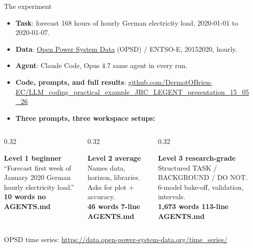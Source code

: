 \documentclass[aspectratio=169,11pt]{beamer}
\newcommand{\levelcard}[3]{%
  \begin{tcolorbox}[
    colback=cardbg, colframe=#1, boxrule=1.2pt, arc=3pt,
    left=6pt, right=6pt, top=4pt, bottom=4pt,
    valign=top, height=3.4cm, fontupper=\small,
  ]
    \textbf{\textcolor{#1}{#2}}\\[2pt]
    \scriptsize\textcolor{gray!40!black}{#3}
  \end{tcolorbox}%
}
\begin{document}
\begin{frame}{The experiment}
  \begin{itemize}\small
    \item \textbf{Task}: forecast 168 hours of hourly German electricity load,
          2020-01-01 to 2020-01-07.
    \item \textbf{Data}: \href{https://data.open-power-system-data.org/time_series/}{Open Power System Data} (OPSD) / ENTSO-E, 2015\textendash{}2020, hourly.
    \item \textbf{Agent}: Claude Code, Opus 4.7 \textemdash{} same agent in every run.
    \item \textbf{Code, prompts, and full results}:
          \href{https://github.com/DermotOBrien-EC/LLM_coding_practical_example_JRC_LEGENT_presentation_15_05_26}%
               {github.com/DermotOBrien-EC/LLM\_coding\_practical\_example\_JRC\_LEGENT\_presentation\_15\_05\_26}
    \item \textbf{Three prompts, three workspace setups:}
  \end{itemize}
  \vspace{4pt}
  \begin{columns}[t,onlytextwidth]
    \begin{column}{0.32\textwidth}
      \levelcard{l1grey}{Level 1 \textemdash{} beginner}{%
        ``Forecast first week of January 2020 German hourly electricity load.''\\
        \textbf{10 words \textperiodcentered{} no AGENTS.md}}
    \end{column}
    \begin{column}{0.32\textwidth}
      \levelcard{l2amber}{Level 2 \textemdash{} average}{%
        Names data, horizon, libraries. Asks for plot + accuracy.\\
        \textbf{46 words \textperiodcentered{} 7-line AGENTS.md}}
    \end{column}
    \begin{column}{0.32\textwidth}
      \levelcard{l3orange}{Level 3 \textemdash{} research-grade}{%
        Structured TASK / BACKGROUND / DO NOT. 6-model bake-off, validation, intervals.\\
        \textbf{1{,}673 words \textperiodcentered{} 113-line AGENTS.md}}
    \end{column}
  \end{columns}
  \vfill
  {\tiny\color{gray!50!black}%
   OPSD time series: \href{https://data.open-power-system-data.org/time_series/}{https://data.open-power-system-data.org/time\_series/}}
\end{frame}
\end{document}
